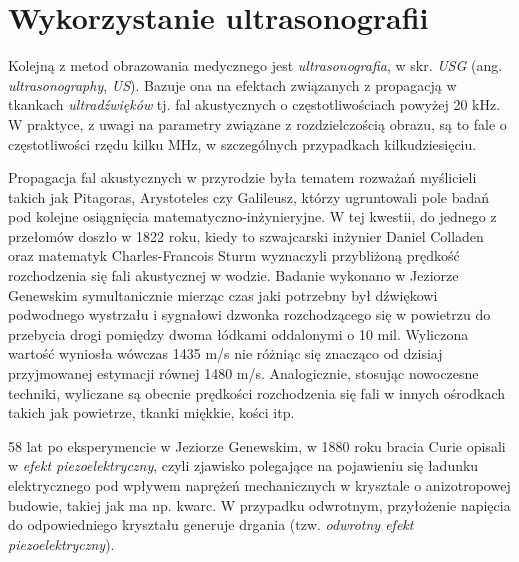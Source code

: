 \section{Wykorzystanie ultrasonografii}
\label{USG}

Kolejną z metod obrazowania medycznego jest \textit{ultrasonografia}, w skr. \textit{USG} (ang. \textit{ultrasonography}, \textit{US}). Bazuje ona na efektach związanych z propagacją w tkankach \textit{ultradźwięków} tj. fal akustycznych o częstotliwościach powyżej 20 kHz. W praktyce, z uwagi na parametry związane z rozdzielczością obrazu, są to fale o częstotliwości rzędu kilku MHz, w szczególnych przypadkach kilkudziesięciu.

Propagacja fal akustycznych w przyrodzie była tematem rozważań myślicieli takich jak Pitagoras, Arystoteles czy Galileusz, którzy ugruntowali pole badań pod kolejne osiągnięcia matematyczno-inżynieryjne. W tej kwestii, do jednego z przełomów doszło w 1822 roku, kiedy to szwajcarski inżynier Daniel Colladen oraz matematyk Charles-Francois Sturm wyznaczyli przybliżoną prędkość rozchodzenia się fali akustycznej w wodzie. Badanie wykonano w Jeziorze Genewskim symultanicznie mierząc czas jaki potrzebny był dźwiękowi podwodnego wystrzału i sygnałowi dzwonka rozchodzącego się w powietrzu do przebycia drogi pomiędzy dwoma łódkami oddalonymi o 10 mil. Wyliczona wartość wyniosła wówczas 1435 m/s nie różniąc się znacząco od dzisiaj przyjmowanej estymacji równej 1480 m/s. Analogicznie, stosując nowoczesne techniki, wyliczane są obecnie prędkości rozchodzenia się fali \linebreak w innych ośrodkach takich jak powietrze, tkanki miękkie, kości itp.

58 lat po eksperymencie w Jeziorze Genewskim, w 1880 roku bracia Curie opisali w \cite{Curie1880} \textit{efekt piezoelektryczny}, czyli zjawisko polegające na pojawieniu się ładunku elektrycznego pod wpływem naprężeń mechanicznych w krysztale o anizotropowej budowie, takiej jak ma np. kwarc. W przypadku odwrotnym, przyłożenie napięcia do odpowiedniego kryształu generuje drgania (tzw. \textit{odwrotny efekt piezoelektryczny}). 

